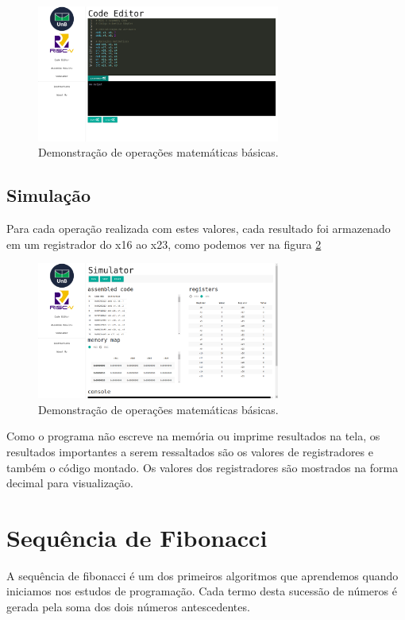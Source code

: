 	\begin{figure}[h]
	  \centering
	  \includegraphics[width=8cm]{img/aritmetica_codigo.png}
	  \caption{Demonstração de operações matemáticas básicas.}
	  \label{fig:operacoes_matematicas_codigo}
	\end{figure}


\subsection{Simulação}
	
	Para cada operação realizada com estes valores, cada resultado foi armazenado em um registrador do x16 ao x23, como podemos ver na figura \ref{fig:operacoes_matematicas_resultados}

	\begin{figure}[h]
	  \centering
	  \includegraphics[width=8cm]{img/aritmetica_results.png}
	  \caption{Demonstração de operações matemáticas básicas.}
	  \label{fig:operacoes_matematicas_resultados}
	\end{figure}

	Como o programa não escreve na memória ou imprime resultados na tela, os resultados importantes a serem ressaltados são os valores de registradores e também o código montado. Os valores dos registradores são mostrados na forma decimal para visualização.


\section{Sequência de Fibonacci}
	
	A sequência de fibonacci é um dos primeiros algoritmos que aprendemos quando iniciamos nos estudos de programação. Cada termo desta sucessão de números é gerada pela soma dos dois números antescedentes.

